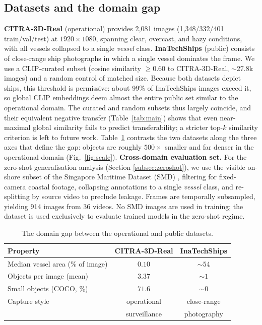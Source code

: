 \documentclass[10pt,conference]{IEEEtran}
\begin{document}
\subsection{Datasets and the domain gap}
\textbf{CITRA-3D-Real} (operational) provides 2{,}081 images
(1{,}348/332/401 train/val/test) at $1920\times1080$, spanning clear, overcast,
and hazy conditions, with all vessels collapsed to a single \emph{vessel} class.
%
\textbf{InaTechShips} \cite{teixeira2025inatechships} (public) consists of
close-range ship photographs in which a single vessel dominates the frame. We use
a CLIP-curated subset (cosine similarity $\ge 0.60$ to CITRA-3D-Real,
$\sim$27.8k images) and a random control of matched size. Because both datasets depict ships, this threshold is permissive: about 99\% of InaTechShips images exceed it, so global CLIP embeddings deem almost the entire public set similar to the operational domain. The curated and random subsets thus largely coincide, and their equivalent negative transfer (Table~\ref{tab:main}) shows that even near-maximal global similarity fails to predict transferability; a stricter top-$k$ similarity criterion is left to future work. Table~\ref{tab:gap}
contrasts the two datasets along the three axes that define the gap: objects are
roughly $500\times$ smaller and far denser in the operational domain (Fig.~\ref{fig:scale}).
%
\textbf{Cross-domain evaluation set.} For the zero-shot generalisation analysis (Section \ref{subsec:zeroshot}), we use the visible on-shore subset of the Singapore Maritime Dataset (SMD) \cite{prasad2017video}, filtering for fixed-camera coastal footage, collapsing annotations to a single \emph{vessel} class, and re-splitting by source video to preclude leakage. Frames are temporally subsampled, yielding 914 images from 36 videos. No SMD images are used in training; the dataset is used exclusively to evaluate trained models in the zero-shot regime.

\begin{table}[!t]
\renewcommand{\arraystretch}{1.15}
\caption{The domain gap between the operational and public datasets.}
\label{tab:gap}
\centering
\footnotesize
\setlength{\tabcolsep}{4pt}
\begin{tabular}{@{}lcc@{}}
\toprule
Property & CITRA-3D-Real & InaTechShips \\
\midrule
Median vessel area (\% of image) & $0.10$ & $\sim 54$ \\
Objects per image (mean)         & $3.37$ & $\sim 1$ \\
Small objects (COCO, \%)         & $71.6$ & $\sim 0$ \\
Capture style                    & operational & close-range \\
                                 & surveillance & photography \\
\bottomrule
\end{tabular}
\end{table}
\end{document}
